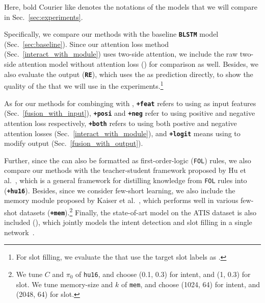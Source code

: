 Here, bold Courier like \textbf{\BLSTM} denotes the notations of the models that we will compare in Sec.~\ref{sec:experiments}.

Specifically, we compare our methods with the baseline \textbf{\texttt{BLSTM}} model (Sec.~\ref{sec:baseline}).
Since our attention loss method (Sec.~\ref{interact_with_module}) uses two-side attention, we include the raw two-side attention model without attention loss (\textbf{\ptatt}) for comparison as well.
Besides, we also evaluate the \RE output (\textbf{\texttt{RE}}), which uses the \REtags as prediction directly, to show the quality of the \REs that we will use in the experiments.\footnote{
	For slot filling, we evaluate the \REs that use the target slot labels as \REtags.}

As for our methods for combinging \REs with \NN,
\textbf{\texttt{+feat}}  refers to using \REtag as input features (Sec.~\ref{fusion_with_input}),
\textbf{\texttt{+posi}} and \textbf{\texttt{+neg}} refer to using positive and negative attention loss respectively,
\textbf{\texttt{+both}} refers to using both postive and negative attention losses (Sec.~\ref{interact_with_module}),
and \textbf{\texttt{+logit}} means using \REtag to modify \NN output (Sec.~\ref{fusion_with_output}).

Further, since the \REs can also be formatted as first-order-logic (\texttt{FOL}) rules, we also compare our methods with the teacher-student framework proposed by Hu et al.~, which is a general framework for distilling knowledge from \texttt{FOL} rules into \NN (\textbf{\texttt{+hu16}}). 
Besides, since we consider few-short learning,  we also include the memory module proposed by Kaiser et al.~, which performs well in various few-shot datasets (\textbf{\texttt{+mem}}).\footnote{
	We tune $C$ and $\pi_0$ of \texttt{hu16}, and choose (0.1, 0.3) for intent, and (1, 0.3) for slot. We tune memory-size and $k$ of \texttt{mem}, and choose (1024, 64) for intent, and (2048, 64) for slot.
}
Finally, the state-of-art model on the ATIS dataset is also included (\textbf{\LL}), which jointly models the intent detection and slot filling in a single network~\cite{liu2016attention}.


